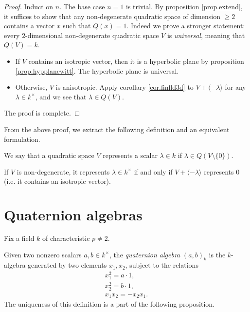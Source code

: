 \documentclass{article}
\newcommand{\qa}[2]{\left(#1\right)_{#2}}
\begin{document}
\begin{proof}
    Induct on $n$. The base case $n=1$ is trivial. By proposition \ref{prop.extend}, it suffices to show that any non-degenerate quadratic space of dimension $\geq 2$ contains a vector $x$ such that $Q(x)=1$. Indeed we prove a stronger statement: every $2$-dimensional non-degenerate quadratic space $V$ is \emph{universal}, meaning that $Q(V)=k$.
    \begin{itemize}
        \item If $V$ contains an isotropic vector, then it is a hyperbolic plane by proposition \ref{prop.hypplanewitt}. The hyperbolic plane is universal.
        \item Otherwise, $V$ is anisotropic. Apply corollary \ref{cor.finfld3d} to $V+\langle-\lambda\rangle$ for any $\lambda\in k^\times$, and we see that $\lambda\in Q(V)$.
    \end{itemize}
    The proof is complete.
\end{proof}

From the above proof, we extract the following definition and an equivalent formulation.

\begin{definition}
    We say that a quadratic space $V$ represents a scalar $\lambda\in k$ if $\lambda\in Q(V\setminus\{0\})$.
\end{definition}

\begin{lemma}
    If $V$ is non-degenerate, it represents $\lambda\in k^\times$ if and only if $V+\langle-\lambda\rangle$ represents $0$ (i.e. it contains an isotropic vector).
\end{lemma}

\section{Quaternion algebras}

Fix a field $k$ of characteristic $p\neq 2$.

\begin{definition}\label{def.quatalg}
    Given two nonzero scalars $a,b\in k^\times$, the \emph{quaternion algebra} $\qa{a,b}{k}$ is the $k$-algebra generated by two elements $x_1,x_2$, subject to the relations
    \begin{gather*}
        x_1^2 = a\cdot 1, \\
        x_2^2 = b\cdot 1, \\
        x_1x_2 = -x_2x_1.
    \end{gather*}
    The uniqueness of this definition is a part of the following proposition.
\end{definition}
\end{document}
